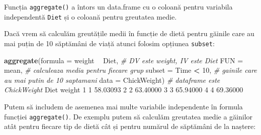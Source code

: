\documentclass[]{article}
\newenvironment{Shaded}{\begin{snugshade}}{\end{snugshade}}
\newcommand{\CommentTok}[1]{\textcolor[rgb]{0.56,0.35,0.01}{\textit{#1}}}
\newcommand{\DataTypeTok}[1]{\textcolor[rgb]{0.13,0.29,0.53}{#1}}
\newcommand{\DecValTok}[1]{\textcolor[rgb]{0.00,0.00,0.81}{#1}}
\newcommand{\FloatTok}[1]{\textcolor[rgb]{0.00,0.00,0.81}{#1}}
\newcommand{\KeywordTok}[1]{\textcolor[rgb]{0.13,0.29,0.53}{\textbf{#1}}}
\newcommand{\NormalTok}[1]{#1}
\newcommand{\OperatorTok}[1]{\textcolor[rgb]{0.81,0.36,0.00}{\textbf{#1}}}
\newcommand{\StringTok}[1]{\textcolor[rgb]{0.31,0.60,0.02}{#1}}
\begin{document}
Funcția \texttt{aggregate()} a întors un data.frame cu o coloană pentru
variabila independentă \texttt{Diet} și o coloană pentru greutatea
medie.

Dacă vrem să calculăm greutățile medii în funcție de dietă pentru
găinile care au mai puțin de 10 săptămâni de viață atunci folosim
opțiunea \texttt{subset}:

\begin{Shaded}
\begin{Highlighting}[]
\KeywordTok{aggregate}\NormalTok{(}\DataTypeTok{formula =}\NormalTok{ weight }\OperatorTok{~}\StringTok{ }\NormalTok{Diet,  }\CommentTok{# DV este weight, IV este Diet}
          \DataTypeTok{FUN =}\NormalTok{ mean,               }\CommentTok{# calculeaza media pentru fiecare grup}
          \DataTypeTok{subset =}\NormalTok{ Time }\OperatorTok{<}\StringTok{ }\DecValTok{10}\NormalTok{,       }\CommentTok{# gainile care au mai putin de 10 saptamani}
          \DataTypeTok{data =}\NormalTok{ ChickWeight)       }\CommentTok{# dataframe este ChickWeight}
\NormalTok{  Diet   weight}
\DecValTok{1}    \DecValTok{1} \FloatTok{58.03093}
\DecValTok{2}    \DecValTok{2} \FloatTok{63.40000}
\DecValTok{3}    \DecValTok{3} \FloatTok{65.94000}
\DecValTok{4}    \DecValTok{4} \FloatTok{69.36000}
\end{Highlighting}
\end{Shaded}

Putem să includem de asemenea mai multe variabile independente în
formula funcției \texttt{aggregate()}. De exemplu putem să calculăm
greutatea medie a găinilor atât pentru fiecare tip de dietă cât și
pentru numărul de săptămâni de la naștere:
\end{document}
